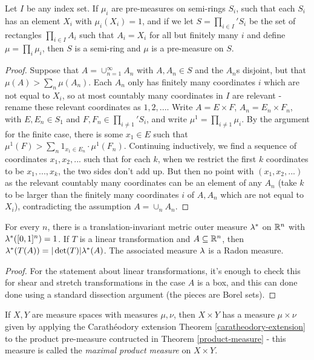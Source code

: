 \documentclass[letterpaper,11pt]{report}
\begin{document}
\begin{thm} Let $I$ be any index set. If $\mu_i$ are pre-measures on semi-rings $S_i$, such that each $S_i$ has an element $X_i$ with $\mu_i(X_i) = 1$, and if we let $S = \prod_{i\in I}' S_i$ be the set of rectangles $\prod_{i \in I} A_i$ such that $A_i = X_i$ for all but finitely many $i$ and define $\mu = \prod_i \mu_i$, then $S$ is a semi-ring and $\mu$ is a pre-measure on $S$.
\end{thm}
\begin{proof} Suppose that $A = \cup_{n=1}^\infty A_n$ with $A, A_n \in S$ and the $A_n$s disjoint, but that $\mu(A) > \sum_n \mu(A_n)$. Each $A_n$ only has finitely many coordinates $i$ which are not equal to $X_i$, so at most countably many coordinates in $I$ are relevant - rename these relevant coordinates as $1, 2, ...$. Write $A = E \times F$, $A_n = E_n \times F_n$, with $E, E_n \in S_1$ and $F, F_n \in \prod_{i \ne 1}' S_i$, and write $\mu^1 = \prod_{i \ne 1} \mu_i$. By the argument for the finite case, there is some $x_1 \in E$ such that $\mu^1(F) > \sum_n 1_{x_1 \in E_n}\cdot \mu^1(F_n)$. Continuing inductively, we find a sequence of coordinates $x_1, x_2, ...$ such that for each $k$, when we restrict the first $k$ coordinates to be $x_1, ..., x_k$, the two sides don't add up. But then no point with $(x_1, x_2, ...)$ as the relevant countably many coordinates can be an element of any $A_n$ (take $k$ to be larger than the finitely many coordinates $i$ of $A, A_n$ which are not equal to $X_i$), contradicting the assumption $A = \cup_n A_n$.
\end{proof}

\begin{cor} For every $n$, there is a translation-invariant metric outer measure $\lambda^*$ on $\mathbb{R}^n$ with $\lambda^*([0,1]^n) = 1$. If $T$ is a linear transformation and $A \subseteq \mathbb{R}^n$, then $\lambda^*(T(A)) = |\det(T)|\lambda^*(A)$. The associated measure $\lambda$ is a Radon measure.
\end{cor}
\begin{proof} For the statement about linear transformations, it's enough to check this for shear and stretch transformations in the case $A$ is a box, and this can done done using a standard dissection argument (the pieces are Borel sets).
\end{proof}

\begin{defn} If $X,Y$ are measure spaces with measures $\mu, \nu$, then $X\times Y$ has a measure $\mu\times \nu$ given by applying the Carath\'eodory extension Theorem \ref{caratheodory-extension} to the product pre-measure contructed in Theorem \ref{product-measure} - this measure is called the \emph{maximal product measure} on $X\times Y$.
\end{defn}
\end{document}
